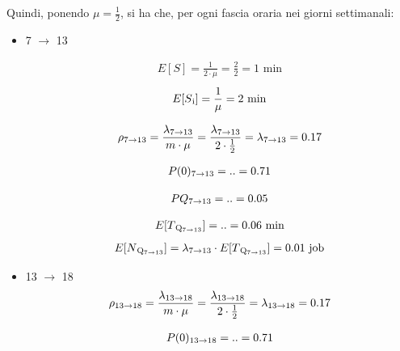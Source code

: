 \documentclass[a4paper, 12pt]{article}
\begin{document}
\bigskip
Quindi, ponendo $\mu = \frac{1}{2}$, si ha che, per ogni fascia oraria nei
giorni settimanali:
\begin{itemize}
  \item 7 $\rightarrow$ 13

\[
\begin{aligned}
  E[S] = \frac{1}{2 \cdot \mu} = \frac{2}{2} = 1 \text{ min}
\end{aligned}
\]
\[
\begin{aligned}
  E[S\textsubscript{i}] = \frac{1}{\mu} = 2 \text{ min}
\end{aligned}
\]


\[
\begin{aligned}
  \rho\textsubscript{7$\rightarrow$13} = \frac{\lambda\textsubscript{7$\rightarrow$13}}{m \cdot \mu}
= \frac{\lambda\textsubscript{7$\rightarrow$13}}{2 \cdot \frac{1}{2}} =\lambda\textsubscript{7$\rightarrow$13} = 0.17
\end{aligned}
\]

\[
\begin{aligned}
  P(0)\textsubscript{7$\rightarrow$13} = .. = 0.71 
\end{aligned}
\]

\[
\begin{aligned}
  PQ\textsubscript{7$\rightarrow$13} = .. = 0.05 
\end{aligned}
\]

\[
\begin{aligned}
  E[T\textsubscript{Q\textsubscript{7$\rightarrow$13}}] = .. = 0.06 \text{ min} 
\end{aligned}
\]
\[
\begin{aligned}
  E[N\textsubscript{Q\textsubscript{7$\rightarrow$13}}] = \lambda\textsubscript{7$\rightarrow$13}
\cdot E[T\textsubscript{Q\textsubscript{7$\rightarrow$13}}] = 0.01 \text{ job} 
\end{aligned}
\]


\item 13 $\rightarrow$ 18
\[
\begin{aligned}
  \rho\textsubscript{13$\rightarrow$18} = \frac{\lambda\textsubscript{13$\rightarrow$18}}{m \cdot \mu}
= \frac{\lambda\textsubscript{13$\rightarrow$18}}{2 \cdot \frac{1}{2}} =\lambda\textsubscript{13$\rightarrow$18} = 0.17
\end{aligned}
\]

\[
\begin{aligned}
  P(0)\textsubscript{13$\rightarrow$18} = .. = 0.71 
\end{aligned}
\]


\end{itemize}
\end{document}
